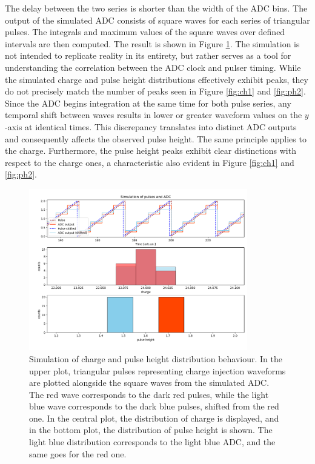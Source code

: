 The delay between the two series is shorter than the width of the ADC bins. The output of the simulated ADC consists of square waves 
for each series of triangular pulses. The integrals and maximum values of the square waves over defined intervals are then computed.
The result is shown in Figure \ref{fig:simsim}. The simulation is not intended to replicate reality in its entirety, 
but rather serves as a tool for understanding the correlation between the ADC clock and pulser timing. 
While the simulated charge and pulse height distributions effectively exhibit peaks, they do not precisely 
match the number of peaks seen in Figure \ref{fig:ch1} and \ref{fig:ph2}. Since the ADC begins integration 
at the same time for both pulse series, any temporal shift between waves results in lower or greater waveform values on the 
$y$-axis at identical times. This discrepancy translates into distinct ADC outputs and consequently affects the observed pulse height. 
The same principle applies to the charge. Furthermore, the pulse height peaks exhibit clear distinctions with respect to the charge ones, 
a characteristic also evident in Figure \ref{fig:ch1} and \ref{fig:ph2}.
\begin{figure}[!h]
  \centering
  \includegraphics[width=0.85\textwidth]{figures/png/pres.png}
  \caption{Simulation of charge and pulse height distribution behaviour. 
  In the upper plot, triangular pulses representing charge injection waveforms are 
  plotted alongside the square waves from the simulated ADC. The red wave corresponds to the dark red pulses, 
  while the light blue wave corresponds to the dark blue pulses, shifted from the red one. In the central plot, 
  the distribution of charge is displayed, and in the bottom plot, the distribution of pulse height is shown. 
  The light blue distribution corresponds to the light blue ADC, and the same goes for the red one.}
  \label{fig:simsim}
\end{figure}
